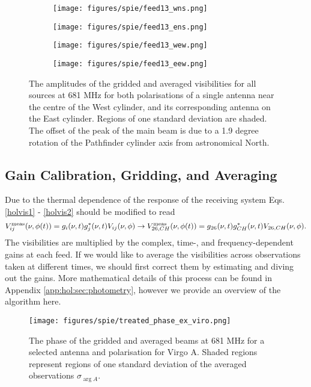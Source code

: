\begin{figure}[h!] %
	\centering
	\begin{subfigure}[b]{0.49\textwidth}%
		\texttt{[image: figures/spie/feed13\_wns.png]}%
	\end{subfigure}%
	\begin{subfigure}[b]{0.47\textwidth}
		\texttt{[image: figures/spie/feed13\_ens.png]}%
	\end{subfigure}
	\begin{subfigure}[b]{0.4925\textwidth}
		\texttt{[image: figures/spie/feed13\_wew.png]}%
	\end{subfigure}
	\begin{subfigure}[b]{0.4675\textwidth}
		\texttt{[image: figures/spie/feed13\_eew.png]}%
	\end{subfigure}
\caption{The amplitudes of the gridded and averaged visibilities for all sources at 681 MHz for both polarisations of a single antenna near the centre of the West cylinder, and its corresponding antenna on the East cylinder. Regions of one standard deviation are shaded. The offset of the peak of the main beam is due to a 1.9 degree rotation of the Pathfinder cylinder axis from astronomical North.}
\vspace{-.1in}
\label{griddeddata}
\end{figure}

\subsection{Gain Calibration, Gridding, and Averaging}
Due to the thermal dependence of the response of the receiving system Eqs. \ref{holvis1} - \ref{holvis2} should be modified to read
\begin{equation}
V^{\rm meas}_{ij}(\nu, \phi(t)) = g_i(\nu, t)g_j^*(\nu, t)V_{ij}(\nu, \phi) \rightarrow V^{\rm meas}_{26,CH}(\nu, \phi(t)) = g_{26}(\nu, t)g_{CH}^*(\nu, t)V_{26,CH}(\nu, \phi).
\label{visgains}
\end{equation}
The visibilities are multiplied by the complex, time-, and frequency-dependent gains at each feed. If we would like to average the visibilities across observations taken at different times, we should first correct them by estimating and diving out the gains. More mathematical details of this process can be found in Appendix \ref{app:hol:sec:photometry}, however we provide an overview of the algorithm here.

\begin{figure}[h!] %
	\centering
	\texttt{[image: figures/spie/treated\_phase\_ex\_viro.png]}%
	\caption{The phase of the gridded and averaged beams at 681 MHz for a selected antenna and polarisation for Virgo A. Shaded regions represent regions of one standard deviation of the averaged observations $\sigma_{\arg{A}}$.}
	\label{phaseav}
\end{figure} 

